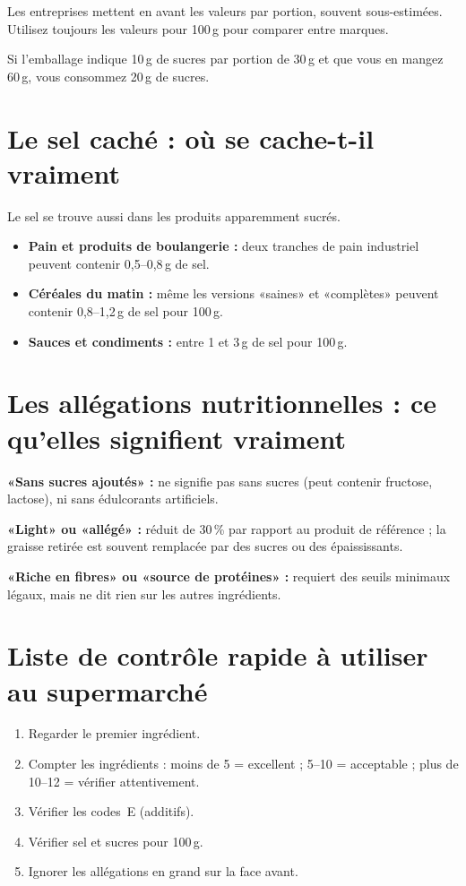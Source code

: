 \documentclass[a5paper,12pt,oneside,openany]{book}
\newcommand{\boxjaune}[2]{%
  \begin{tcolorbox}[boitebase,
    colback=jaune!12!white, colframe=jaune!80!black, title={#1}]
  #2\end{tcolorbox}}
\begin{document}
Les entreprises mettent en avant les valeurs par portion, souvent sous-estimées.
Utilisez toujours les valeurs pour 100\,g pour comparer entre marques.

\boxjaune{Exemple}{Si l'emballage indique 10\,g de sucres par portion de 30\,g
et que vous en mangez 60\,g, vous consommez 20\,g de sucres.}

\section{Le sel caché : où se cache-t-il vraiment}

Le sel se trouve aussi dans les produits apparemment sucrés.

\begin{itemize}
  \item \textbf{Pain et produits de boulangerie :} deux tranches de pain industriel
    peuvent contenir 0,5--0,8\,g de sel.
  \item \textbf{Céréales du matin :} même les versions «saines» et «complètes»
    peuvent contenir 0,8--1,2\,g de sel pour 100\,g.
  \item \textbf{Sauces et condiments :} entre 1 et 3\,g de sel pour 100\,g.
\end{itemize}

\section{Les allégations nutritionnelles : ce qu'elles signifient vraiment}

\textbf{«Sans sucres ajoutés» :} ne signifie pas sans sucres (peut contenir
fructose, lactose), ni sans édulcorants artificiels.

\textbf{«Light» ou «allégé» :} réduit de 30\,\% par rapport au produit de
référence ; la graisse retirée est souvent remplacée par des sucres ou des
épaississants.

\textbf{«Riche en fibres» ou «source de protéines» :} requiert des seuils
minimaux légaux, mais ne dit rien sur les autres ingrédients.

\section{Liste de contrôle rapide à utiliser au supermarché}

\begin{enumerate}
  \item Regarder le premier ingrédient.
  \item Compter les ingrédients : moins de 5 = excellent ; 5--10 = acceptable ;
    plus de 10--12 = vérifier attentivement.
  \item Vérifier les codes~E (additifs).
  \item Vérifier sel et sucres pour 100\,g.
  \item Ignorer les allégations en grand sur la face avant.
\end{enumerate}
\end{document}
